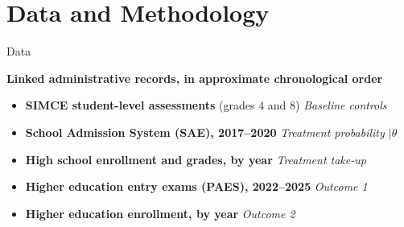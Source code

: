 \documentclass[notes,11pt, aspectratio=169]{beamer}
\begin{document}
\section{Data and Methodology}
\begin{frame}{Data}

\textbf{Linked administrative records, in approximate chronological order}

\vspace{0.5em}

\begin{itemize}
    \item \textbf{SIMCE student-level assessments} (grades 4 and 8)  
    \hfill \textit{Baseline controls}

    \vspace{0.4em}
    \item \textbf{School Admission System (SAE), 2017--2020}  
    \hfill \textit{Treatment probability   $\mid \theta$}

    \vspace{0.4em}
    \item \textbf{High school enrollment and grades, by year}  
    \hfill \textit{Treatment take-up}

    \vspace{0.4em}
    \item \textbf{Higher education entry exams (PAES), 2022--2025}  
    \hfill \textit{Outcome 1}

    \vspace{0.4em}
    \item \textbf{Higher education enrollment, by year}  
    \hfill \textit{Outcome 2}
\end{itemize}

\end{frame}
\end{document}
